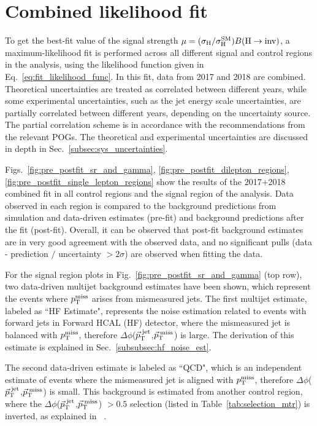 \section{Combined likelihood fit}
\label{sec:sr_cr_fit}

\newcommand\resultPlotDir{merged_2023-04-08_vbfhinv_full_analysis_NLO_VJets_09Apr23_thesis_v1/plotsSRAndCRFit}

\graphicspath{{4_Results/Figures}}

To get the best-fit value of the signal strength $\mu=(\sigma_{\mathrm{H}}/\sigma_{\mathrm{H}}^{\mathrm{SM}}) {B(\textrm{H}\rightarrow\text{inv})}$, a maximum-likelihood fit is performed
across all different signal and control regions in the analysis, using the likelihood function given 
in Eq.~\ref{eq:fit_likelihood_func}. In this fit, data from 2017 and 2018 are combined. Theoretical uncertainties
are treated as correlated between different years, while some experimental uncertainties, such as the jet energy
scale uncertainties, are partially correlated between different years, depending on the uncertainty source.
The partial correlation scheme is in accordance with the recommendations from the relevant POGs.
The theoretical and experimental uncertainties are discussed in depth in Sec.~\ref{subsec:sys_uncertainties}.

Figs.~\ref{fig:pre_postfit_sr_and_gamma}, \ref{fig:pre_postfit_dilepton_regions}, \ref{fig:pre_postfit_single_lepton_regions}
show the results of the 2017+2018 combined fit in all control regions and the signal region of the analysis.
Data observed in each region is compared to the background predictions from simulation and data-driven estimates (pre-fit) and
background predictions after the fit (post-fit). Overall, it can be observed that post-fit background
estimates are in very good agreement with the observed data, and no significant pulls 
(data - prediction $/$ uncertainty $> 2\sigma$) are observed when fitting the data. 

For the signal region plots in Fig.~\ref{fig:pre_postfit_sr_and_gamma} (top row), two data-driven multijet background estimates
have been shown, which represent the events where $p_{\textrm{T}}^{\textrm{miss}}$ arises from mismeasured jets. The first multijet estimate, labeled as ``HF Estimate", 
represents the noise estimation related to events with forward jets in Forward HCAL (HF) detector, where the mismeasured jet is balanced
with $p_{\textrm{T}}^{\textrm{miss}}$, therefore $\Delta\phi$(${\vec p}_{\mathrm{T}}^{\;\text{jet}}$,$\vec{p}_{\textrm{T}}^{\;\textrm{miss}}$) is large. The derivation of this estimate is explained in Sec.~\ref{subsubsec:hf_noise_est}.

The second data-driven estimate is labeled as ``QCD", which is an independent estimate of events where the mismeasured jet is aligned with $p_{\textrm{T}}^{\textrm{miss}}$,
therefore $\Delta\phi$(${\vec p}_{\mathrm{T}}^{\;\text{jet}}$,$\vec{p}_{\textrm{T}}^{\;\textrm{miss}}$) is small. This background is estimated from another control region, where the $\Delta\phi$(${\vec p}_{\mathrm{T}}^{\;\text{jet}}$,$\vec{p}_{\textrm{T}}^{\;\textrm{miss}}$)
$> 0.5$ selection (listed in Table~\ref{tab:selection_mtr}) is inverted, as explained in ~\cite{VBFHinvAnalysisPaper}.

